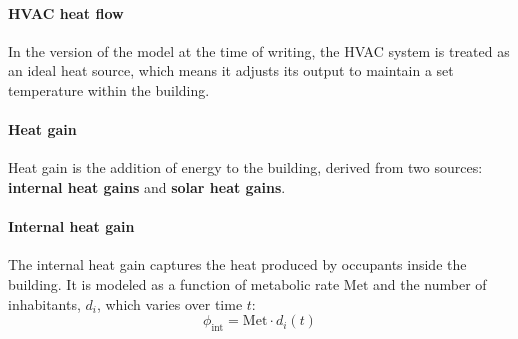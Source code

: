\documentclass[runningheads]{llncs}
\begin{document}
\paragraph{HVAC heat flow} In the version of the model at the time of writing, the HVAC system is treated as an ideal heat source, which means it adjusts its output to maintain a set temperature within the building.

\paragraph{Heat gain} Heat gain is the addition of energy to the building, derived from two sources: \textbf{internal heat gains} and \textbf{solar heat gains}.

\paragraph{Internal heat gain} The internal heat gain captures the heat produced by occupants inside the building. 
It is modeled as a function of metabolic rate $\mathrm{Met}$ and the number of inhabitants, $d_i$, which varies over time $t$:
\begin{equation}
  \phi_{\mathrm{int}} = \mathrm{Met} \cdot d_i(t)
\end{equation}
\end{document}
